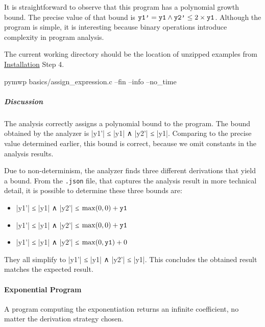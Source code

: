 It is straightforward to observe that this program has a polynomial growth
bound. The precise value of that bound is \(\prm{y1'} = \prm{y1} \land \prm{y2'}
\leq 2 \times \prm{y1}\). Although the program is simple, it is
interesting because binary operations introduce complexity in program analysis.

The current working directory should be the location of unzipped examples from
\hyperref[guide-install]{Installation} Step 4.

\begin{center}
\begin{minipage}{\textwidth}
\begin{cmdlisting}[label={lst:ex1-run}]
pymwp basics/assign_expression.c --fin --info --no_time
\end{cmdlisting}
\end{minipage}
\end{center}

\begin{center}
\begin{minipage}{\textwidth}
\end{minipage}
\label{lst:ex-output}
\end{center}

\subparagraph*{Discussion}
The analysis correctly assigns a polynomial bound to the program. The bound
obtained by the analyzer is \pr|y1'| ≤ \pr|y1| ∧
\pr|y2'| ≤ \pr|y1|. Comparing to the precise value determined
earlier, this bound is correct, because we omit constants in the analysis
results.

Due to non-determinism, the analyzer finds three different
derivations that yield a bound. From the \texttt{.json} file, that captures the
analysis result in more technical detail, it is possible to determine these
three bounds are:
\begin{itemize}
\item \pr|y1'| ≤ \pr|y1| ∧ \pr|y2'| ≤ \(\max(0,0) + \prm{y1}\)
\item \pr|y1'| ≤ \pr|y1| ∧ \pr|y2'| ≤ \(\max(0,0) + \prm{y1}\)
\item \pr|y1'| ≤ \pr|y1| ∧ \pr|y2'| ≤ \(\max(0,\prm{y1}) + 0\)
\end{itemize}
They all simplify to \pr|y1'| ≤ \pr|y1| ∧ \pr|y2'| ≤ \pr|y1|.
This concludes the obtained result matches the expected result.

\paragraph{Exponential Program}\label{exponential-program}
A program computing the exponentiation returns an infinite coefficient, no
matter the derivation strategy chosen.

